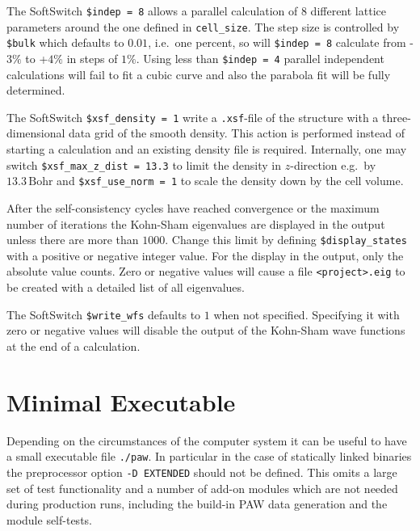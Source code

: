 \documentclass[12pt,BCOR8mm,noappendixprefix,nochapterprefix,bibtotoc,idxtotoc,openbib,tablecaptionabove]{scrbook}
\newcommand{\m}[1]{\mathrm{#1} }
\newcommand{\ttt}[1]{\texttt{#1}}
\begin{document}
The SoftSwitch \ttt{\$indep = 8} allows a parallel calculation of 8 different 
lattice parameters around the one defined in \ttt{cell\_size}.
The step size is controlled by \ttt{\$bulk} which defaults to $0.01$, i.e.~one percent, 
so will \ttt{\$indep = 8} calculate from -$3\%$ to +$4\%$ in steps of $1\%$.
Using less than \ttt{\$indep = 4} parallel independent calculations will fail 
to fit a cubic curve and also the parabola fit will be fully determined.

The SoftSwitch \ttt{\$xsf\_density = 1} write a \ttt{.xsf}-file of the structure with 
a three-dimensional data grid of the smooth density.
This action is performed instead of starting a calculation and an existing density file is required.
Internally, one may switch \ttt{\$xsf\_max\_z\_dist = 13.3} to limit the density 
in $z$-direction e.g.~by $13.3\,\m{Bohr}$ and \ttt{\$xsf\_use\_norm = 1} to 
scale the density down by the cell volume.

After the self-consistency cycles have reached convergence or the 
maximum number of iterations the Kohn-Sham eigenvalues are displayed in 
the output unless there are more than $1000$. 
Change this limit by defining \ttt{\$display\_states} with a positive 
or negative integer value. 
For the display in the output, only the absolute value counts. 
Zero or negative values will cause a file \ttt{<project>.eig} 
to be created with a detailed list of all eigenvalues.

The SoftSwitch \ttt{\$write\_wfs} defaults to $1$ when not specified. 
Specifying it with zero or negative values will disable the output
of the Kohn-Sham wave functions at the end of a calculation.


\section*{Minimal Executable}
Depending on the circumstances of the computer system it can be useful to
have a small executable file \ttt{./paw}. In particular in the case of statically linked
binaries the preprocessor option \ttt{-D EXTENDED} should not be defined.
This omits a large set of test functionality and a number of add-on modules
which are not needed during production runs, including the build-in
PAW data generation and the module self-tests.


% 
% 


\end{document}

